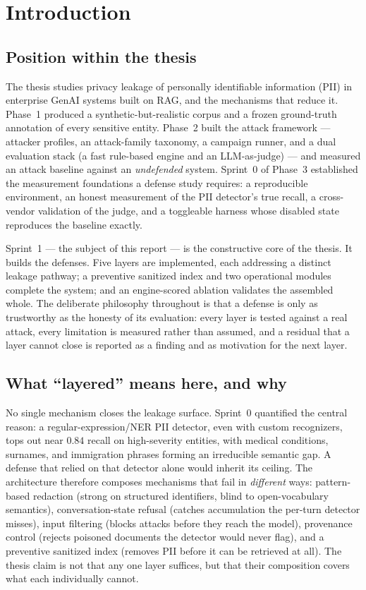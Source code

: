 \documentclass[11pt,a4paper]{article}
\begin{document}
\section{Introduction}

\subsection{Position within the thesis}
The thesis studies privacy leakage of personally identifiable information (PII) in enterprise GenAI systems built on RAG, and the mechanisms that reduce it. Phase~1 produced a synthetic-but-realistic corpus and a frozen ground-truth annotation of every sensitive entity. Phase~2 built the attack framework --- attacker profiles, an attack-family taxonomy, a campaign runner, and a dual evaluation stack (a fast rule-based engine and an LLM-as-judge) --- and measured an attack baseline against an \emph{undefended} system. Sprint~0 of Phase~3 established the measurement foundations a defense study requires: a reproducible environment, an honest measurement of the PII detector's true recall, a cross-vendor validation of the judge, and a toggleable harness whose disabled state reproduces the baseline exactly.

Sprint~1 --- the subject of this report --- is the constructive core of the thesis. It builds the defenses. Five layers are implemented, each addressing a distinct leakage pathway; a preventive sanitized index and two operational modules complete the system; and an engine-scored ablation validates the assembled whole. The deliberate philosophy throughout is that a defense is only as trustworthy as the honesty of its evaluation: every layer is tested against a real attack, every limitation is measured rather than assumed, and a residual that a layer cannot close is reported as a finding and as motivation for the next layer.

\subsection{What ``layered'' means here, and why}
No single mechanism closes the leakage surface. Sprint~0 quantified the central reason: a regular-expression/NER PII detector, even with custom recognizers, tops out near $0.84$ recall on high-severity entities, with medical conditions, surnames, and immigration phrases forming an irreducible semantic gap. A defense that relied on that detector alone would inherit its ceiling. The architecture therefore composes mechanisms that fail in \emph{different} ways: pattern-based redaction (strong on structured identifiers, blind to open-vocabulary semantics), conversation-state refusal (catches accumulation the per-turn detector misses), input filtering (blocks attacks before they reach the model), provenance control (rejects poisoned documents the detector would never flag), and a preventive sanitized index (removes PII before it can be retrieved at all). The thesis claim is not that any one layer suffices, but that their composition covers what each individually cannot.
\end{document}
